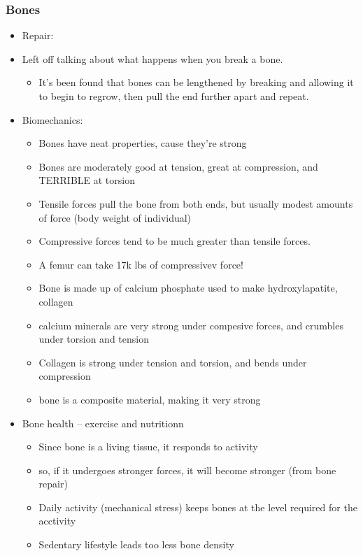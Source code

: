 \documentclass{article}
\theoremstyle{definition}
\begin{document}
\subsubsection{Bones}
\begin{itemize}
	\item Repair:
	\item Left off talking about what happens when you break a bone.
		\begin{itemize}
			\item It's been found that bones can be lengthened by breaking and allowing it to begin to regrow, then pull the end further apart and repeat.
		\end{itemize}
	\item Biomechanics:
		\begin{itemize}
			\item Bones have neat properties, cause they're strong
			\item Bones are moderately good at tension, great at compression, and TERRIBLE at torsion
			\item Tensile forces pull the bone from both ends, but usually modest amounts of force (body weight of individual)
			\item Compressive forces tend to be much greater than tensile forces.
			\item A femur can take 17k lbs of compressivev force!
			\item Bone is made up of calcium phosphate used to make hydroxylapatite, collagen
			\item calcium minerals are very strong under compesive forces, and crumbles under torsion and tension
			\item Collagen is strong under tension and torsion, and bends under compression
			\item bone is a composite material, making it very strong
		\end{itemize}
	\item Bone health -- exercise and nutritionn
		\begin{itemize}
			\item Since bone is a living tissue, it responds to activity
			\item so, if it undergoes stronger forces, it will become stronger (from bone repair)
			\item Daily activity (mechanical stress) keeps bones at the level required for the acctivity
			\item Sedentary lifestyle leads too less bone density
				\begin{itemize}

\end{itemize}
\end{itemize}
\end{itemize}
\end{document}
